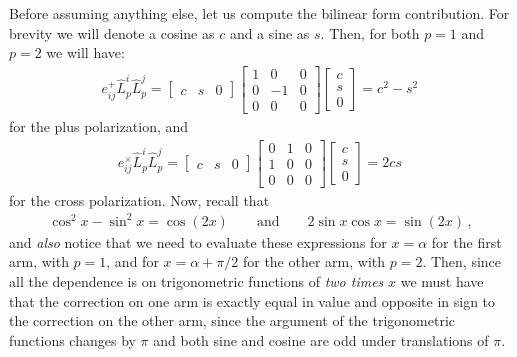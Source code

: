 \documentclass[main.tex]{subfiles}
\begin{document}
Before assuming anything else, let us compute the bilinear form contribution. For brevity we will denote a cosine as \(c\) and a sine as \(s\). Then, for both \(p =1\) and \(p=2\) we will have: 
%
\begin{subequations}
\begin{align}
e_{ij}^{+} \hat{L}^{i}_{p} \hat{L}^{j}_p 
= \left[\begin{array}{ccc}
c & s & 0
\end{array}\right] 
\left[\begin{array}{ccc}
1 & 0 & 0 \\ 
0 & -1 & 0 \\ 
0 & 0 & 0
\end{array}\right] 
\left[\begin{array}{c}
c \\ 
s \\ 
0
\end{array}\right]= c^2- s^2 
\,
\end{align}
\end{subequations}
%
for the plus polarization, and 
%
\begin{subequations}
\begin{align}
e_{ij}^{ \times } \hat{L}^{i}_{p} \hat{L}^{j}_p 
= \left[\begin{array}{ccc}
c & s & 0
\end{array}\right] 
\left[\begin{array}{ccc}
0 & 1 & 0 \\ 
1 & 0 & 0 \\ 
0 & 0 & 0
\end{array}\right] 
\left[\begin{array}{c}
c \\ 
s \\ 
0
\end{array}\right]= 2cs
\,
\end{align}
\end{subequations}
%
for the cross polarization. Now, recall that 
%
\begin{align}
\cos^2 x - \sin^2 x = \cos(2x) \qquad \text{and} \qquad
2 \sin x \cos x = \sin (2 x)
\,,
\end{align}
%
and \emph{also} notice that we need to evaluate these expressions for \(x = \alpha \) for the first arm, with \(p=1\), and for \(x = \alpha + \pi /2\) for the other arm, with \(p=2\). Then, since all the dependence is on trigonometric functions of \emph{two times} \(x\) we must have that the correction on one arm is exactly equal in value and opposite in sign to the correction on the other arm, since the argument of the trigonometric functions changes by \(\pi \) and both sine and cosine are odd under translations of \(\pi \).
\end{document}
